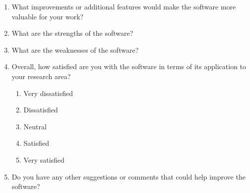 \documentclass[12pt, titlepage]{article}
\begin{document}
\begin{enumerate}
\item What improvements or additional features would make the software more valuable for your work?
\item What are the strengths of the software?
\item What are the weaknesses of the software?
\item Overall, how satisfied are you with the software in terms of its application to your research area?
\begin{enumerate}
    \item Very dissatisfied
    \item Dissatisfied
    \item Neutral
    \item Satisfied
    \item Very satisfied
\end{enumerate}

\item Do you have any other suggestions or comments that could help improve the software?
\end{enumerate}
\end{document}
